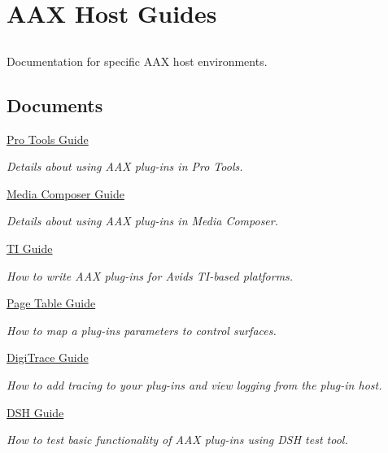 \hypertarget{a00359}{}\section{A\+A\+X Host Guides}
\label{a00359}


\subsection{ }
Documentation for specific A\+A\+X host environments. 

\subsection*{Documents}
\begin{DoxyCompactItemize}
\item 
\hyperlink{a00360}{Pro Tools Guide}
\begin{DoxyCompactList}\small\item\em Details about using A\+A\+X plug-\/ins in Pro Tools. \end{DoxyCompactList}\item 
\hyperlink{a00361}{Media Composer Guide}
\begin{DoxyCompactList}\small\item\em Details about using A\+A\+X plug-\/ins in Media Composer. \end{DoxyCompactList}\item 
\hyperlink{a00362}{T\+I Guide}
\begin{DoxyCompactList}\small\item\em How to write A\+A\+X plug-\/ins for Avid\textquotesingle{}s T\+I-\/based platforms. \end{DoxyCompactList}\item 
\hyperlink{a00363}{Page Table Guide}
\begin{DoxyCompactList}\small\item\em How to map a plug-\/in\textquotesingle{}s parameters to control surfaces. \end{DoxyCompactList}\item 
\hyperlink{a00364}{Digi\+Trace Guide}
\begin{DoxyCompactList}\small\item\em How to add tracing to your plug-\/ins and view logging from the plug-\/in host. \end{DoxyCompactList}\item 
\hyperlink{a00365}{D\+S\+H Guide}
\begin{DoxyCompactList}\small\item\em How to test basic functionality of A\+A\+X plug-\/ins using D\+S\+H test tool. \end{DoxyCompactList}\item 

\end{DoxyCompactItemize}
